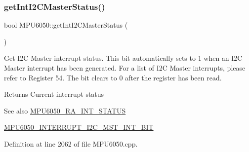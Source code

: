 \begin{DoxyCode}{0}

\end{DoxyCode}
\mbox{\label{classMPU6050_a31d6c2b03fc2d6ce82d67d142f316851}} 
\subsubsection{\texorpdfstring{getIntI2CMasterStatus()}{getIntI2CMasterStatus()}}
{\footnotesize\ttfamily bool M\+P\+U6050\+::get\+Int\+I2\+C\+Master\+Status (\begin{DoxyParamCaption}{ }\end{DoxyParamCaption})}

Get I2C Master interrupt status. This bit automatically sets to 1 when an I2C Master interrupt has been generated. For a list of I2C Master interrupts, please refer to Register 54. The bit clears to 0 after the register has been read. \begin{DoxyReturn}{Returns}
Current interrupt status 
\end{DoxyReturn}
\begin{DoxySeeAlso}{See also}
\mbox{\hyperlink{MPU6050_8h_a8337320c5ccc92def830e968d2e19d75}{M\+P\+U6050\+\_\+\+R\+A\+\_\+\+I\+N\+T\+\_\+\+S\+T\+A\+T\+US}} 

\mbox{\hyperlink{MPU6050_8h_afb0bff7cde199d7806469f93b6e59b02}{M\+P\+U6050\+\_\+\+I\+N\+T\+E\+R\+R\+U\+P\+T\+\_\+\+I2\+C\+\_\+\+M\+S\+T\+\_\+\+I\+N\+T\+\_\+\+B\+IT}} 
\end{DoxySeeAlso}


Definition at line 2062 of file M\+P\+U6050.\+cpp.


